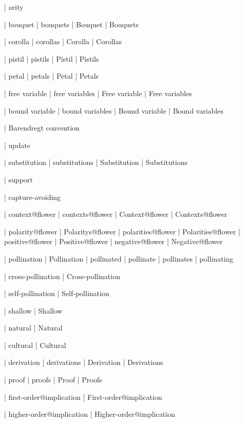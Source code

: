  | arity

 | bouquet
 | bouquets
 | Bouquet
 | Bouquets

 | corolla
 | corollas
 | Corolla
 | Corollas

 | pistil
 | pistils
 | Pistil
 | Pistils

 | petal
 | petals
 | Petal
 | Petals

 | free variable
 | free variables
 | Free variable
 | Free variables

 | bound variable
 | bound variables
 | Bound variable
 | Bound variables

 | Barendregt convention

 | update

 | substitution
 | substitutions
 | Substitution
 | Substitutions

 | support

 | capture-avoiding

 | context@flower
 | contexts@flower
 | Context@flower
 | Contexts@flower

 | polarity@flower
 | Polaritys@flower
 | polarities@flower
 | Polarities@flower
 | positive@flower
 | Positive@flower
 | negative@flower
 | Negative@flower

 | pollination
 | Pollination
 | pollinated
 | pollinate
 | pollinates
 | pollinating

 | cross-pollination
 | Cross-pollination

 | self-pollination
 | Self-pollination

 | shallow
 | Shallow

 | natural
 | Natural

 | cultural
 | Cultural

 | derivation
 | derivations
 | Derivation
 | Derivations

 | proof
 | proofs
 | Proof
 | Proofs
 
 | first-order@implication
 | First-order@implication

 | higher-order@implication
 | Higher-order@implication

